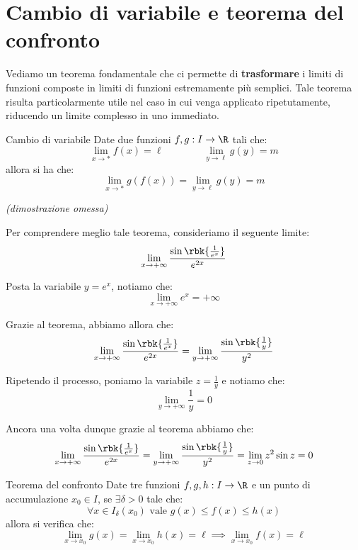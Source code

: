 \documentclass[a4paper, 12pt]{report}
\begin{document}
    \newpage

    \section{Cambio di variabile e teorema del confronto}

    Vediamo un teorema fondamentale che ci permette di \textbf{trasformare} i limiti di funzioni composte in limiti di funzioni estremamente più semplici. Tale teorema risulta particolarmente utile nel caso in cui venga applicato ripetutamente, riducendo un limite complesso in uno immediato.

    \begin{framedthm}{Cambio di variabile}
        Date due funzioni $f,g : I \to \R$ tali che:
        \[\lim_{x \to *} f(x) = \ell \qquad\qquad \lim_{y \to \ell} g(y) = m\]
        allora si ha che:
        \[\lim_{x \to *} g(f(x)) = \lim_{y \to \ell} g(y) = m\]

        \textit{(dimostrazione omessa)}
    \end{framedthm}

    Per comprendere meglio tale teorema, consideriamo il seguente limite:
    \[\lim_{x \to +\infty} \frac{\sin \rbk{\frac{1}{e^x}}}{e^{2x}}\]

    Posta la variabile $y = e^x$, notiamo che:
    \[\lim_{x \to +\infty} e^x = +\infty\]

    Grazie al teorema, abbiamo allora che:
    \[\lim_{x \to +\infty} \frac{\sin \rbk{\frac{1}{e^x}}}{e^{2x}} = \lim_{y \to +\infty} \frac{\sin \rbk{\frac{1}{y}}}{y^2}\]

    Ripetendo il processo, poniamo la variabile $z = \frac{1}{y}$ e notiamo che:
    \[\lim_{y \to +\infty} \frac{1}{y} = 0\]

    Ancora una volta dunque grazie al teorema abbiamo che:
    \[\lim_{x \to +\infty} \frac{\sin \rbk{\frac{1}{e^x}}}{e^{2x}} = \lim_{y \to +\infty} \frac{\sin \rbk{\frac{1}{y}}}{y^2} = \lim_{z \to 0} z^2 \sin z = 0\]

    \begin{framedthm}{Teorema del confronto}
        Date tre funzioni $f,g,h : I \to \R$ e un punto di accumulazione $x_0 \in I$, se $\exists \delta > 0$ tale che:
        \[\forall x \in I_\delta(x_0) \text{ vale } g(x) \leq f(x) \leq h(x)\]
        allora si verifica che:
        \[\lim_{x \to x_0} g(x) = \lim_{x \to x_0} h(x) = \ell \implies \lim_{x \to x_0} f(x) = \ell\]
    \end{framedthm}
    
\end{document}
